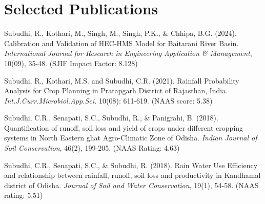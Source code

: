 \documentclass[]{deedy-resume-openfont}
\begin{document}
\begin{minipage}[t]{0.66\textwidth}
\section{Selected Publications}
\begin{tightemize}
\item Subudhi, R., Kothari, M., Singh, M., Singh, P.K., \& Chhipa, B.G. (2024). Calibration and Validation of HEC-HMS Model for Baitarani River Basin. \textit{International Journal for Research in Engineering Application \& Management}, 10(09), 35-48. (SJIF Impact Factor: 8.128)
\item Subudhi, R., Kothari, M.S. and Subudhi, C.R. (2021). Rainfall Probability Analysis for Crop Planning in Pratapgarh District of Rajasthan, India. \textit{Int.J.Curr.Microbiol.App.Sci.} 10(08): 611-619. (NAAS score: 5.38)
\item Subudhi, C.R., Senapati, S.C., Subudhi, R., \& Panigrahi, B. (2018). Quantification of runoff, soil loss and yield of crops under different cropping systems in North Eastern ghat Agro-Climatic Zone of Odisha. \textit{Indian Journal of Soil Conservation}, 46(2), 199-205. (NAAS Rating: 4.63)
\item Subudhi, C.R., Senapati, S.C., \& Subudhi, R. (2018). Rain Water Use Efficiency and relationship between rainfall, runoff, soil loss and productivity in Kandhamal district of Odisha. \textit{Journal of Soil and Water Conservation}, 19(1), 54-58. (NAAS rating: 5.51)
\end{tightemize}
\sectionsep

\end{minipage}
\end{document}
